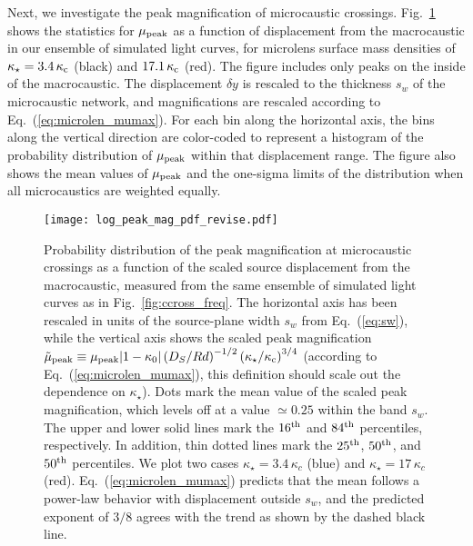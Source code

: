 \documentclass{aastex6}
\newcommand{\refeq}[1]{Eq.~(\ref{eq:#1})}
\newcommand{\reffig}[1]{Fig.~\ref{fig:#1}}
\begin{document}
Next, we investigate the peak magnification of microcaustic crossings. \reffig{peak_mag} shows the statistics for $\mu_{\rm peak}$ as a function of displacement from the macrocaustic in our ensemble of simulated light curves, for microlens surface mass densities of $\kappa_\star = 3.4 \, \kappa_{\rm c}$ (black) and $17.1 \, \kappa_{\rm c}$ (red). The figure includes only peaks on the inside of the macrocaustic. The displacement $\delta y$ is rescaled to the thickness $s_w$ of the microcaustic network, and magnifications are rescaled according to \refeq{microlen_mumax}. For each bin along the horizontal axis, the bins along the vertical direction are color-coded to represent a histogram of the probability distribution of $\mu_{\rm peak}$ within that displacement range. The figure also shows the mean values of $\mu_{\rm peak}$ and the one-sigma limits of the distribution when all microcaustics are weighted equally. 

\begin{figure}[t]
\begin{center}
  \texttt{[image: log\_peak\_mag\_pdf\_revise.pdf]}
\caption{\label{fig:peak_mag} Probability distribution of the peak magnification at microcaustic crossings as a function of the scaled source displacement from the macrocaustic, measured from the same ensemble of simulated light curves as in \reffig{ccross_freq}. The horizontal axis has been rescaled in units of the source-plane width $s_w$ from \refeq{sw}, while the vertical axis shows the scaled peak magnification $\tilde{\mu}_{\rm peak} \equiv \mu_{\rm peak} \vert 1 - \kappa_0 \vert \left( D_S/R d \right)^{-1/2} \left( \kappa_\star/\kappa_{\rm c} \right)^{3/4}$ (according to \refeq{microlen_mumax}, this definition should scale out the dependence on $\kappa_\star$). Dots mark the mean value of the scaled peak magnification, which levels off at a value $\simeq 0.25$ within the band $s_w$. The upper and lower solid lines mark the $16^{\rm th}$ and $84^{\rm th}$ percentiles, respectively. In addition, thin dotted lines mark the $25^{\rm th}$, $50^{\rm th}$, and $50^{\rm th}$ percentiles. We plot two cases $\kappa_\star = 3.4\,\kappa_c$ (blue) and $\kappa_\star = 17\,\kappa_c$ (red). \refeq{microlen_mumax} predicts that the mean follows a power-law behavior with displacement outside $s_w$, and the predicted exponent of $3/8$ agrees with the trend as shown by the dashed black line.}
\end{center}
\end{figure}
\end{document}
